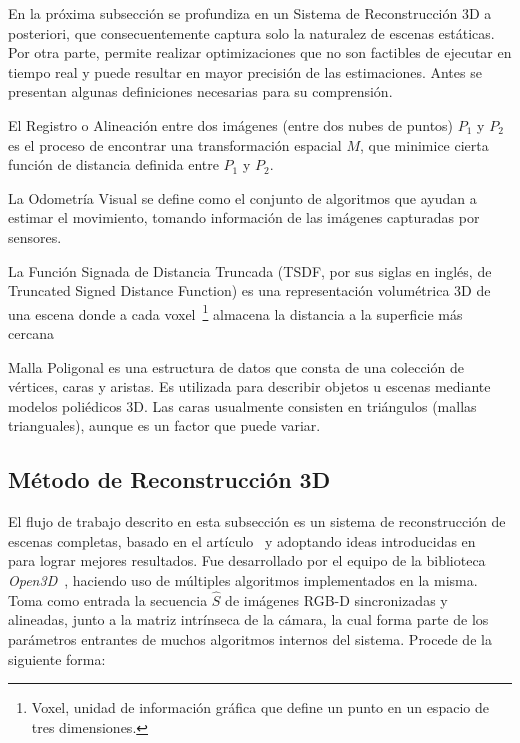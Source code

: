 En la próxima subsección se profundiza en un Sistema de Reconstrucción 3D a posteriori, que consecuentemente captura solo la naturalez de escenas estáticas. Por otra parte, permite realizar optimizaciones que no son factibles de ejecutar en tiempo real y puede resultar en mayor precisión de las estimaciones. Antes se presentan algunas definiciones necesarias para su comprensión.

\begin{definition}
	El Registro o Alineación entre dos imágenes (entre dos nubes de puntos) $P_1$ y $P_2$ es el proceso de encontrar una transformación espacial $M$, que minimice cierta función de distancia definida entre $P_1$ y $P_2$.
\end{definition}

\begin{definition}
	La Odometría Visual se define como el conjunto de algoritmos que ayudan a estimar el movimiento, tomando información de las imágenes capturadas por sensores.
\end{definition}

\begin{definition}
	La Función Signada de Distancia Truncada (TSDF, por sus siglas en inglés, de Truncated Signed Distance Function) es una representación volumétrica 3D de una escena donde a cada voxel~\footnote{Voxel, unidad de información gráfica que define un punto en un espacio de tres dimensiones.} almacena la distancia a la superficie más cercana~\cite{curless1996volumetric}
\end{definition}


\begin{definition}
	Malla Poligonal es una estructura de datos que consta de una colección de vértices, caras y aristas. Es utilizada para describir objetos u escenas mediante modelos poliédicos 3D. Las caras usualmente consisten en triángulos (mallas trianguales), aunque es un factor que puede variar.
\end{definition}


\subsection{Método de Reconstrucción 3D}\label{section:rec3dmet}

El flujo de trabajo descrito en esta subsección es un sistema de reconstrucción de escenas completas, basado en el artículo~\cite{choi2015robust} y adoptando ideas introducidas en~\cite{park2017colored} para lograr mejores resultados. Fue desarrollado por el equipo de la biblioteca \textit{Open3D}~\cite{zhou2018open3d}, haciendo uso de múltiples algoritmos implementados en la misma. Toma como entrada la secuencia $\hat{S}$ de imágenes RGB-D sincronizadas y alineadas, junto a la matriz intrínseca de la cámara, la cual forma parte de los parámetros entrantes de muchos algoritmos internos del sistema. Procede de la siguiente forma:

